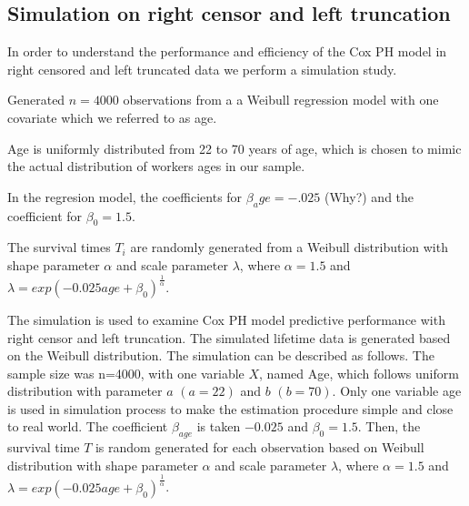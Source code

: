 \documentclass[12pt,letterpaper]{article}
\begin{document}
 \subsection{Simulation on right censor and left truncation}
 
 In order to understand the performance and efficiency of the Cox PH model in right censored and left truncated data we perform a simulation study.
 
 Generated $n = 4000$ observations  from a a Weibull regression model  with one covariate which we referred to as age.  
 
 Age is uniformly distributed from 22 to 70 years of age, which is chosen to mimic the actual distribution of workers ages in our sample.
 
 In the regresion model, the coefficients for $\beta_age = -.025$ (Why?) and the coefficient for $\beta_0 = 1.5$. 
 
 The survival times $T_i$ are randomly generated from a Weibull distribution with shape parameter $\alpha$ and scale parameter $\lambda$, where $\alpha=1.5$ and $\lambda=exp(-0.025age+\beta_0)^{\frac{1}{\alpha}}$.
 
 
 The simulation is used to examine Cox PH model predictive performance with right censor and left truncation. The simulated lifetime data is generated based on the Weibull distribution. %
 The simulation can be described as follows. The sample size was n=4000, with one variable $X$, named Age, which follows uniform distribution with parameter $a$ $(a=22)$ and $b$ $(b=70)$. Only one variable age is used in simulation process to make the estimation procedure simple and close to real world. The coefficient $\beta_{age}$ is taken $-0.025$ and $\beta_0=1.5$.
 Then, the survival time $T$ is random generated for each observation based on Weibull distribution with shape parameter $\alpha$ and scale parameter $\lambda$, where $\alpha=1.5$ and $\lambda=exp(-0.025age+\beta_0)^{\frac{1}{\alpha}}$.
\end{document}
